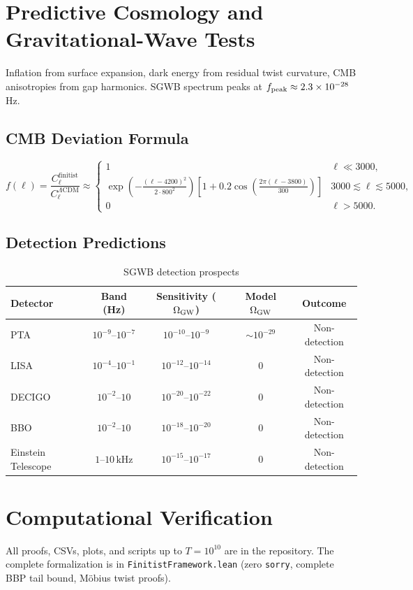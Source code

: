 \documentclass[11pt]{article}
\begin{document}
\section{Predictive Cosmology and Gravitational-Wave Tests}
Inflation from surface expansion, dark energy from residual twist curvature, CMB anisotropies from gap harmonics. SGWB spectrum peaks at \(f_{\rm peak} \approx 2.3 \times 10^{-28}\) Hz.

\subsection{CMB Deviation Formula}
\[
f(\ell) = \frac{C_\ell^{\text{finitist}}}{C_\ell^{\Lambda\text{CDM}}} \approx
\begin{cases}
1 & \ell \ll 3000, \\
\exp\left( -\frac{(\ell - 4200)^2}{2 \cdot 800^2} \right) \left[ 1 + 0.2 \cos\left( \frac{2\pi (\ell - 3800)}{300} \right) \right] & 3000 \lesssim \ell \lesssim 5000, \\
0 & \ell > 5000.
\end{cases}
\]

\subsection{Detection Predictions}
\begin{table}[h]
\centering
\caption{SGWB detection prospects}
\begin{tabular}{lcccc}
\toprule
Detector & Band (Hz) & Sensitivity (\(\Omega_{\rm GW}\)) & Model \(\Omega_{\rm GW}\) & Outcome \\
\midrule
PTA & \(10^{-9}\)--\(10^{-7}\) & \(10^{-10}\)--\(10^{-9}\) & \(\sim 10^{-29}\) & Non-detection \\
LISA & \(10^{-4}\)--\(10^{-1}\) & \(10^{-12}\)--\(10^{-14}\) & 0 & Non-detection \\
DECIGO & \(10^{-2}\)--\(10\) & \(10^{-20}\)--\(10^{-22}\) & 0 & Non-detection \\
BBO & \(10^{-2}\)--\(10\) & \(10^{-18}\)--\(10^{-20}\) & 0 & Non-detection \\
Einstein Telescope & \(1\)--\(10\,\text{kHz}\) & \(10^{-15}\)--\(10^{-17}\) & 0 & Non-detection \\
\bottomrule
\end{tabular}
\end{table}

\section{Computational Verification}
All proofs, CSVs, plots, and scripts up to \(T=10^{10}\) are in the repository. The complete formalization is in \texttt{FinitistFramework.lean} (zero \texttt{sorry}, complete BBP tail bound, Möbius twist proofs).
\end{document}
